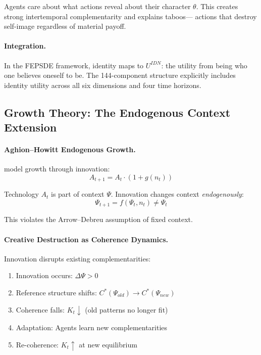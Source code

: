 Agents care about what actions reveal about their character $\theta$.
This creates strong intertemporal complementarity and explains taboos---
actions that destroy self-image regardless of material payoff.

\paragraph{Integration.}
In the FEPSDE framework, identity maps to $U^{IDN}$:
the utility from being who one believes oneself to be.
The 144-component structure explicitly includes identity utility
across all six dimensions and four time horizons.

\subsection{Growth Theory: The Endogenous Context Extension}

\paragraph{Aghion--Howitt Endogenous Growth.}
\citet{aghionhowitt} model growth through innovation:
\begin{equation}
  A_{t+1} = A_t \cdot (1 + g(n_t))
\end{equation}

Technology $A_t$ is part of context $\Psi$.
Innovation changes context \emph{endogenously}:
\begin{equation}
  \Psi_{t+1} = f(\Psi_t, n_t) \neq \Psi_t
\end{equation}

This violates the Arrow--Debreu assumption of fixed context.

\paragraph{Creative Destruction as Coherence Dynamics.}
Innovation disrupts existing complementarities:
\begin{enumerate}
  \item Innovation occurs: $\Delta \Psi > 0$
  \item Reference structure shifts: $C^*(\Psi_{old}) \to C^*(\Psi_{new})$
  \item Coherence falls: $K_t \downarrow$ (old patterns no longer fit)
  \item Adaptation: Agents learn new complementarities
  \item Re-coherence: $K_t \uparrow$ at new equilibrium
\end{enumerate}

